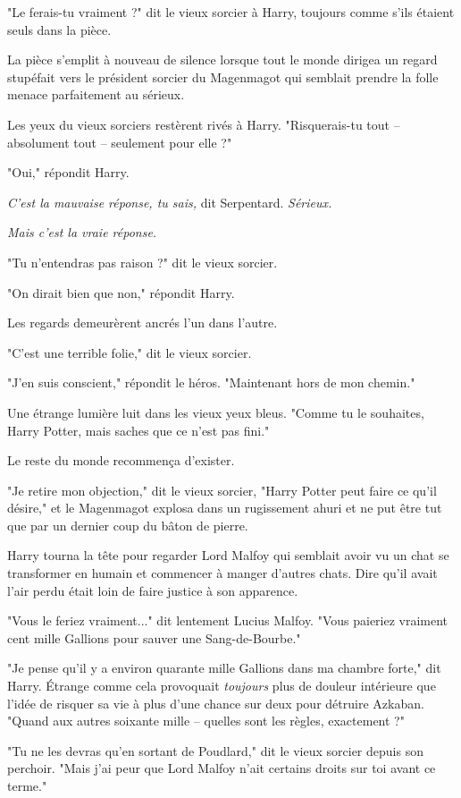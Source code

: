 "Le ferais-tu vraiment ?" dit le vieux sorcier à Harry, toujours comme s'ils étaient seuls dans la pièce.

La pièce s'emplit à nouveau de silence lorsque tout le monde dirigea un regard stupéfait vers le président sorcier du Magenmagot qui semblait prendre la folle menace parfaitement au sérieux.

Les yeux du vieux sorciers restèrent rivés à Harry. "Risquerais-tu tout – absolument tout – seulement pour elle ?"

"Oui," répondit Harry.

\emph{C'est la mauvaise réponse, tu sais, } dit Serpentard. \emph{Sérieux.} 

\emph{Mais c'est la vraie réponse.} 

"Tu n'entendras pas raison ?" dit le vieux sorcier.

"On dirait bien que non," répondit Harry.

Les regards demeurèrent ancrés l'un dans l'autre.

"C'est une terrible folie," dit le vieux sorcier.

"J'en suis conscient," répondit le héros. "Maintenant hors de mon chemin."

Une étrange lumière luit dans les vieux yeux bleus. "Comme tu le souhaites, Harry Potter, mais saches que ce n'est pas fini."

Le reste du monde recommença d'exister.

"Je retire mon objection," dit le vieux sorcier, "Harry Potter peut faire ce qu'il désire," et le Magenmagot explosa dans un rugissement ahuri et ne put être tut que par un dernier coup du bâton de pierre.

Harry tourna la tête pour regarder Lord Malfoy qui semblait avoir vu un chat se transformer en humain et commencer à manger d'autres chats. Dire qu'il avait l'air perdu était loin de faire justice à son apparence.

"Vous le feriez vraiment..." dit lentement Lucius Malfoy. "Vous paieriez vraiment cent mille Gallions pour sauver une Sang-de-Bourbe."

"Je pense qu'il y a environ quarante mille Gallions dans ma chambre forte," dit Harry. Étrange comme cela provoquait \emph{toujours}  plus de douleur intérieure que l'idée de risquer sa vie à plus d'une chance sur deux pour détruire Azkaban. "Quand aux autres soixante mille – quelles sont les règles, exactement ?"

"Tu ne les devras qu'en sortant de Poudlard," dit le vieux sorcier depuis son perchoir. "Mais j'ai peur que Lord Malfoy n'ait certains droits sur toi avant ce terme."

